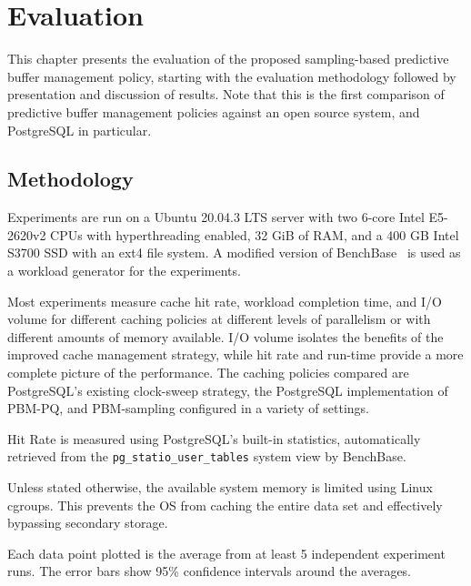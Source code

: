 
\chapter{Evaluation}
\label{ch:evaluation}

This chapter presents the evaluation of the proposed sampling-based predictive buffer management policy, starting with the evaluation methodology followed by presentation and discussion of results. Note that this is the first comparison of predictive buffer management policies against an open source system, and PostgreSQL in particular.

\section{Methodology}
Experiments are run on a Ubuntu 20.04.3 LTS server with two 6-core Intel E5-2620v2 CPUs with hyperthreading enabled, 32 GiB of RAM, and a 400 GB Intel S3700 SSD with an ext4 file system. A modified version of BenchBase~\cite{BenchBase} is used as a workload generator for the experiments.


Most experiments measure cache hit rate, workload completion time, and I/O volume for different caching policies at different levels of parallelism or with different amounts of memory available. I/O volume isolates the benefits of the improved cache management strategy, while hit rate and run-time provide a more complete picture of the performance. The caching policies compared are PostgreSQL's existing clock-sweep strategy, the PostgreSQL implementation of PBM-PQ, and PBM-sampling configured in a variety of settings.

Hit Rate is measured using PostgreSQL's built-in statistics, automatically retrieved from the \verb|pg_statio_user_tables| system view by BenchBase.

Unless stated otherwise, the available system memory is limited using Linux cgroups. This prevents the OS from caching the entire data set and effectively bypassing secondary storage.

Each data point plotted is the average from at least 5 independent experiment runs. The error bars show 95\% confidence intervals around the averages.


